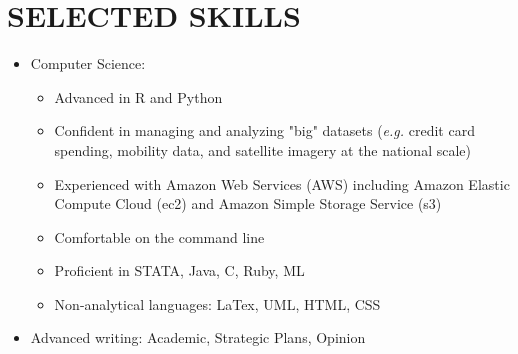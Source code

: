 \documentclass[11pt]{article}
\begin{document}
\section*{SELECTED SKILLS}
\begin{itemize}[left=0pt]
    \item Computer Science:
    \begin{itemize}
        \item Advanced in R and Python
        \item Confident in managing and analyzing "big" datasets (\textit{e.g.} credit card spending, mobility data, and satellite imagery at the national scale)
        \item Experienced with Amazon Web Services (AWS) including Amazon Elastic Compute Cloud (ec2) and Amazon Simple Storage Service (s3)
        \item Comfortable on the command line
        \item Proficient in STATA, Java, C, Ruby, ML
        \item Non-analytical languages: LaTex, UML, HTML, CSS
    \end{itemize}
    \item Advanced writing: Academic, Strategic Plans, Opinion
\end{itemize}
\end{document}
